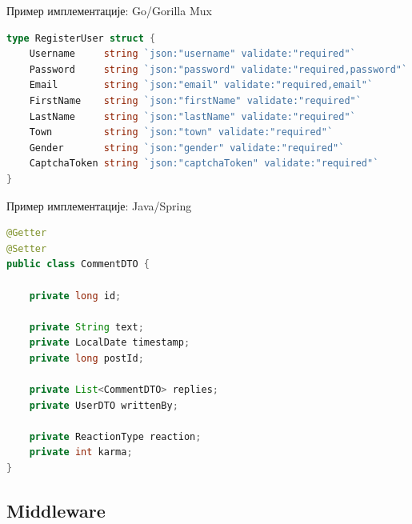 \documentclass{beamer}
\begin{document}
    \begin{frame}[fragile]{Пример имплементације: Go/Gorilla Mux}
        \begin{adjustbox}{width=\textwidth,height=\textheight,keepaspectratio}
            \begin{lstlisting}[language=go]
type RegisterUser struct {
    Username     string `json:"username" validate:"required"`
    Password     string `json:"password" validate:"required,password"`
    Email        string `json:"email" validate:"required,email"`
    FirstName    string `json:"firstName" validate:"required"`
    LastName     string `json:"lastName" validate:"required"`
    Town         string `json:"town" validate:"required"`
    Gender       string `json:"gender" validate:"required"`
    CaptchaToken string `json:"captchaToken" validate:"required"`
}
            \end{lstlisting}
        \end{adjustbox}
    \end{frame}
    
    \begin{frame}[fragile]{Пример имплементације: Java/Spring}
        \begin{adjustbox}{width=0.7\textwidth,height=\textheight,keepaspectratio}
            \begin{lstlisting}[language=java]
@Getter
@Setter
public class CommentDTO {

    private long id;

    private String text;
    private LocalDate timestamp;
    private long postId;

    private List<CommentDTO> replies;
    private UserDTO writtenBy;

    private ReactionType reaction;
    private int karma;
}
            \end{lstlisting}
        \end{adjustbox}
    \end{frame}
    
    \subsection{Middleware}
    
\end{document}
